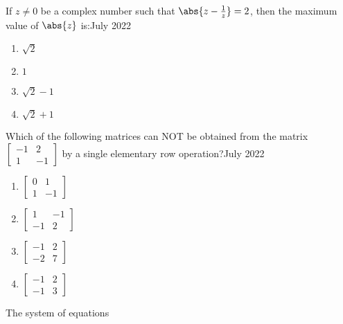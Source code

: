 \iffalse
   \title{Assignment}
   \author{EE24BTECH11034}
   \section{mcq-single}
\fi 
    \item If $z\ne0$ be a complex number such that $\abs{z-\frac{1}{z}}=2$, then the maximum value of $\abs{z}$ is:\hfill{July 2022}
    
        \begin{multicols}{4}
        \begin{enumerate}
        \item $\sqrt{2}$
        \item $1$
        \item $\sqrt{2}-1$
        \item $\sqrt{2}+1$
        \end{enumerate}
        \end{multicols}

    \item Which of the following matrices can NOT be obtained from the matrix $\begin{bmatrix}-1 & 2 \\ 1 & -1\end{bmatrix}$ by a single elementary row operation?\hfill{July 2022}

        \begin{multicols}{4}
        \begin{enumerate}
        \item $\begin{bmatrix}0 & 1 \\ 1 & -1\end{bmatrix}$
        \item $\begin{bmatrix}1 & -1 \\ -1 & 2\end{bmatrix}$
        \item $\begin{bmatrix}-1 & 2 \\ -2 & 7\end{bmatrix}$
        \item $\begin{bmatrix}-1 & 2 \\ -1 & 3\end{bmatrix}$
        \end{enumerate}
        \end{multicols}

    \item The system of equations

